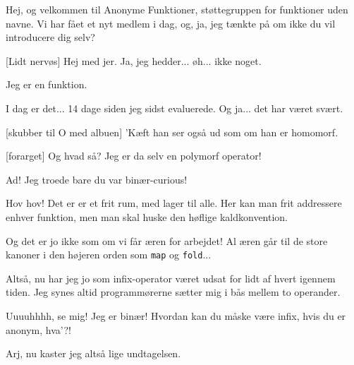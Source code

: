\documentclass[a4paper,11pt]{article}
\begin{document}
\begin{sketch}



 Hej, og velkommen til Anonyme Funktioner, støttegruppen for
funktioner uden navne. Vi har fået et nyt medlem i dag, og, ja, jeg
tænkte på om ikke du vil introducere dig selv?

[Lidt nervøs] Hej med jer. Ja, jeg hedder... øh... ikke noget.


 Jeg er en funktion.


 I dag er det... 14 dage siden jeg sidst evaluerede. Og ja... det
         har været svært.

[skubber til O med albuen] 'Kæft han ser også ud som om han er homomorf.

[forarget] Og hvad så?  Jeg er da selv en polymorf operator!

 Ad!  Jeg troede bare du var binær-curious!

 Hov hov!  Det er er et frit rum, med lager til alle.  Her kan
man frit addressere enhver funktion, men man skal huske den høflige
kaldkonvention.

 Og det er jo ikke som om vi får æren for arbejdet! Al æren
går til de store kanoner i den højeren orden som \texttt{map} og
\texttt{fold}...


 Altså, nu har jeg jo som infix-operator været udsat for lidt
af hvert igennem tiden.  Jeg synes altid programmørerne sætter mig i
bås mellem to operander.

 Uuuuhhhh, se mig! Jeg er binær! Hvordan kan du måske være infix,
         hvis du er anonym, hva'?!

 Arj, nu kaster jeg altså lige undtagelsen.


\end{sketch}
\end{document}

